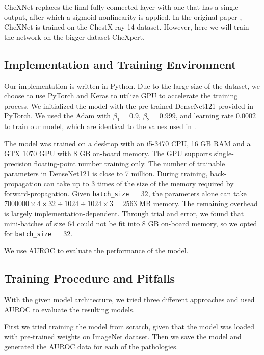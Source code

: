 \documentclass{amia}
\begin{document}
CheXNet replaces the final fully connected layer with one that has a single output, after which a sigmoid nonlinearity is applied. In the original paper {\color{cyan}\cite{rajpurkar}}, CheXNet is  trained on the ChestX-ray 14 dataset. However, here we will train the network on the bigger dataset CheXpert. 



\subsection{Implementation and Training Environment}



Our implementation is written in Python. Due to the large size of the dataset,  we choose to use PyTorch and Keras to utilize GPU to accelerate the training process. We initialized the model with the pre-trained DenseNet121 provided in PyTorch. We used the Adam with $\beta_1 = 0.9$, $\beta_2 = 0.999$, and learning rate $0.0002$ to train our model, which are identical to the values used in {\color{cyan}\cite{irvin}}.

The model was trained on a desktop with an i5-3470 CPU, 16 GB RAM and a GTX 1070 GPU with 8 GB on-board memory. The GPU supports single-precision floating-point number training only. The number of trainable parameters in DenseNet121 is close to 7 million. During training, back-propagation can take up to 3 times of the size of the memory required by forward-propagation. Given \texttt{batch\_size} $=32$, the parameters alone can take $7000000 \times 4 \times 32 \div 1024 \div 1024 \times 3 = 2563$ MB memory. The remaining overhead is largely implementation-dependent. Through trial and error, we found that mini-batches of size 64 could not be fit into 8 GB on-board memory, so we opted for \texttt{batch\_size} $=32$.


We use AUROC to evaluate the performance of the model.

\subsection{Training Procedure and Pitfalls}
With the given model architecture, we tried three different approaches and used AUROC to evaluate the resulting models.


First we tried training the model from scratch, given that the model was loaded with pre-trained weights on ImageNet dataset. Then we save the model and generated the AUROC data for each of the pathologies.
\end{document}
